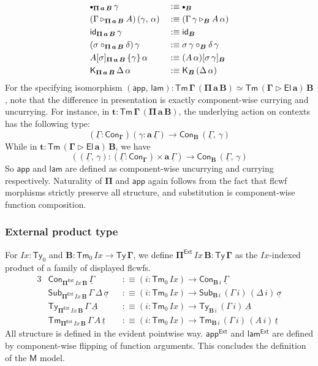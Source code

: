 \documentclass[12pt,a4paper,twoside,openany]{book}
\theoremstyle{remark}
\theoremstyle{definition}
\theoremstyle{theorem}
\newcommand{\mi}[1]{\mathit{#1}}
\newcommand{\ms}[1]{\mathsf{#1}}
\newcommand{\bs}[1]{\boldsymbol{#1}}
\newcommand{\Ix}{\mi{Ix}}
\newcommand{\id}{\mathsf{id}}
\newcommand{\Con}{\mathsf{Con}}
\newcommand{\Sub}{\mathsf{Sub}}
\newcommand{\Tm}{\mathsf{Tm}}
\newcommand{\Ty}{\mathsf{Ty}}
\newcommand{\El}{\mathsf{El}}
\newcommand{\ext}{\triangleright}
\newcommand{\emptycon}{\scaleobj{.75}\bullet}
\newcommand{\Pie}{\Pi^{\mathsf{Ext}}}
\newcommand{\appe}{\mathsf{app^{Ext}}}
\newcommand{\lame}{\mathsf{lam^{Ext}}}
\newcommand{\K}{\mathsf{K}}
\newcommand{\bGamma}{\bs{\Gamma}}
\newcommand{\ba}{\bs{a}}
\newcommand{\bB}{\bs{B}}
\newcommand{\bM}{\bs{\mathsf{M}}}
\newcommand{\ul}[1]{\underline{#1}}
\newcommand{\ulGamma}{\ul{\Gamma}}
\newcommand{\ulsigma}{\ul{\sigma}}
\newcommand{\ult}{\ul{t}}
\newcommand{\ulA}{\ul{A}}
\newcommand{\app}{\ms{app}}
\newcommand{\lam}{\ms{lam}}
\newcommand{\defn}{:\equiv}
\begin{document}
\begin{alignat*}{3}
  &\emptycon_{\bs{\Pi\,a\,B}}\,\gamma &&\defn \emptycon_{\bB}\\
  &(\Gamma \ext_{\bs{\Pi\,a\,B}} A)\,(\gamma,\,\alpha) &&\defn (\Gamma\,\gamma \ext_{\bB} A\,\alpha)\\
  &\id_{\bs{\Pi\,a\,B}}\,\gamma &&\defn \id_{\bB}\\
  &(\sigma \circ_{\bs{\Pi\,a\,B}} \delta)\,\gamma &&\defn \sigma\,\gamma \circ_{\bB} \delta\,\gamma\\
  &A[\sigma]_{\bs{\Pi\,a\,B}}\,\{\gamma\}\,\alpha &&\defn (A\,\alpha)[\sigma\,\gamma]_{\bB}\\
  &\K_{\bs{\Pi\,a\,B}}\,\Delta\,\alpha &&\defn \K_{\bB}\,(\Delta\,\alpha)
\end{alignat*}
\endgroup
For the specifying isomorphism $\bs{(\app,\,\lam) : \Tm\,\Gamma\,(\Pi\,a\,B)
  \simeq \Tm\,(\Gamma \ext \El\,a)\,B}$, note that the difference in
presentation is exactly component-wise currying and uncurrying. For instance, in
$\bs{t : \Tm\,\Gamma\,(\Pi\,a\,B)}$, the underlying action on contexts has the following
type:
\[
  (\ulGamma : \Con_{\bGamma})(\gamma : \ba\,\ulGamma) \to \Con_{\bB}\,(\ulGamma,\,\gamma)
\]
While in $\bs{t : \Tm\,(\Gamma \ext \El\,a)\,B}$, we have
\[
  ((\ulGamma,\,\gamma) : (\ulGamma : \Con_{\bGamma}) \times \ba\,\ulGamma) \to \Con_{\bB}\,(\ulGamma,\,\gamma)
\]
So $\bs{\app}$ and $\bs{\lam}$ are defined as component-wise uncurrying and
currying respectively.  Naturality of $\bs{\Pi}$ and $\bs{\app}$ again follows
from the fact that flcwf morphisms strictly preserve all structure, and
substitution is component-wise function composition.

\subsubsection{External product type}

For $\Ix : \Ty_0$ and $\bB : \Tm_0\,\Ix \to \bs{\Ty\,\Gamma}$, we define
$\bs{\Pie}\,\Ix\,\bB : \bs{\Ty\,\Gamma}$ as the $\Ix$-indexed product of
a family of displayed flcwfs.
\begin{alignat*}{3}
  & \Con_{\bs{\Pie}\,\Ix\,\bB}\,\ulGamma &&\defn (i : \Tm_0\,\Ix) \to \Con_{\bB\,i}\,\ulGamma\\
  & \Sub_{\bs{\Pie}\,\Ix\,\bB}\,\Gamma\,\Delta\,\ulsigma &&\defn (i : \Tm_0\,\Ix) \to \Sub_{\bB\,i}\,(\Gamma\,i)\,(\Delta\,i)\,\ulsigma\\
  &  \Ty_{\bs{\Pie}\,\Ix\,\bB}\,\Gamma\,\ulA &&\defn (i : \Tm_0\,\Ix) \to \Ty_{\bB\,i}\,(\Gamma\,i)\,\ulA\\
  &  \Tm_{\bs{\Pie}\,\Ix\,\bB}\,\Gamma\,A\,\ult &&\defn (i : \Tm_0\,\Ix) \to \Tm_{\bB\,i}\,(\Gamma\,i)\,(A\,i)\,\ult
\end{alignat*}
All structure is defined in the evident pointwise way. $\bs{\appe}$ and
$\bs{\lame}$ are defined by component-wise flipping of function arguments. This
concludes the definition of the $\bM$ model.
\end{document}
